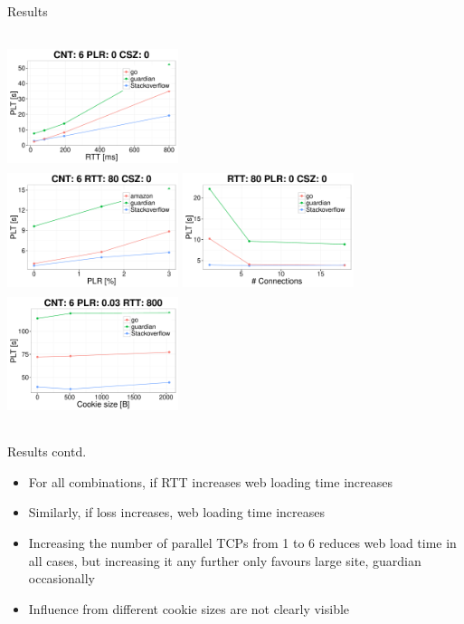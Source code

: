 \documentclass[t,xcolor=dvipsnames,english,bigger,aspectratio=43,hyperref={unicode=true}]{beamer}
\begin{document}
\begin{frame}{Results}
\begin{columns}[t]
\centering
\includegraphics[width=5cm,height=3.5cm]{imgs/rtt}\\
\includegraphics[width=5cm,height=3.5cm]{imgs/plr}
\centering
\includegraphics[width=5cm,height=3.5cm]{imgs/cnt}\\
\includegraphics[width=5cm,height=3.5cm]{imgs/csz}
\end{columns}

\end{frame}
\begin{frame}{Results contd.}
\begin{itemize}
\item For all combinations, if RTT increases web loading time increases
\item Similarly, if loss increases, web loading time increases
\item Increasing the number of parallel TCPs from 1 to 6 reduces web load time in all cases, 
but increasing it any further only favours large site, guardian occasionally
\item  Influence from different cookie sizes are not clearly visible
\end{itemize}
\end{frame}
\end{document}
